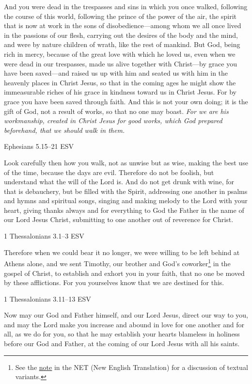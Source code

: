 \documentclass[
]{article}
\newcommand{\RL}[1]{\beginR #1\endR}
\begin{document}
And you were dead in the trespasses and sins in which you once walked,
following the course of this world, following the prince of the power of
the air, the spirit that is now at work in the sons of
disobedience---among whom we all once lived in the passions of our
flesh, carrying out the desires of the body and the mind, and were by
nature children of wrath, like the rest of mankind. But God, being rich
in mercy, because of the great love with which he loved us, even when we
were dead in our trespasses, made us alive together with Christ---by
grace you have been saved---and raised us up with him and seated us with
him in the heavenly places in Christ Jesus, so that in the coming ages
he might show the immeasurable riches of his grace in kindness toward us
in Christ Jesus. For by grace you have been saved through faith. And
this is not your own doing; it is the gift of God, not a result of
works, so that no one may boast. \emph{For we are his workmanship,
created in Christ Jesus for good works, which God prepared beforehand,
that we should walk in them.}

Ephesians 5.15--21 ESV

Look carefully then how you walk, not as unwise but as wise, making the
best use of the time, because the days are evil. Therefore do not be
foolish, but understand what the will of the Lord is. And do not get
drunk with wine, for that is debauchery, but be filled with the Spirit,
addressing one another in psalms and hymns and spiritual songs, singing
and making melody to the Lord with your heart, giving thanks always and
for everything to God the Father in the name of our Lord Jesus Christ,
submitting to one another out of reverence for Christ.

1 Thessalonians 3.1--3 ESV

Therefore when we could bear it no longer, we were willing to be left
behind at Athens alone, and we sent Timothy, our brother and God\RL{'}s
coworker\footnote{See the
  \href{https://netbible.org/bible/1+Thessalonians+3}{\ul{note}} in the
  NET (New English Translation) for a discussion of textual variants.}
in the gospel of Christ, to establish and exhort you in your faith, that
no one be moved by these afflictions. For you yourselves know that we
are destined for this.

1 Thessalonians 3.11--13 ESV

Now may our God and Father himself, and our Lord Jesus, direct our way
to you, and may the Lord make you increase and abound in love for one
another and for all, as we do for you, so that he may establish your
hearts blameless in holiness before our God and Father, at the coming of
our Lord Jesus with all his saints.
\end{document}
